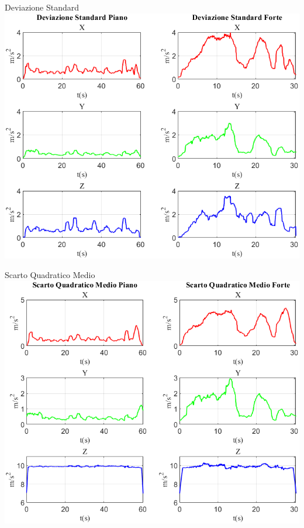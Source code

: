 \documentclass[beamer]{standalone}
\begin{document}
		\begin{frame}{{Deviazione Standard}}
				\centering\includegraphics[height=.8\textheight]{figure/Acc/Deviazione Standard}
			\end{frame}
	
	\begin{frame}{{Scarto Quadratico Medio}}
		\centering\includegraphics[height=.8\textheight]{figure/Acc/Scarto Quadratico Medio}
	\end{frame}
	
\end{document}

